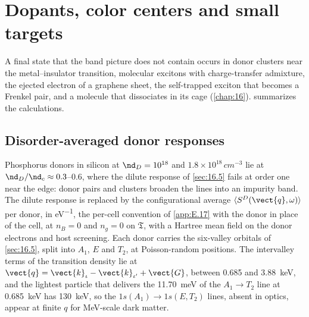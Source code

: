 \section{Dopants, color centers and small targets}\label{app:E.21}

A final state that the band picture does not contain occurs in donor clusters near the metal--insulator transition, molecular excitons with charge-transfer admixture, the ejected electron of a graphene sheet, the self-trapped exciton that becomes a Frenkel pair, and a molecule that dissociates in its cage (\cref{chap:16}).  summarizes the calculations.

\subsection{Disorder-averaged donor responses}

Phosphorus donors in silicon at $\nd_D = 10^{18}$ and $1.8\times10^{18}\,\si{cm^{-3}}$ lie at $\nd_D/\nd_c \approx 0.3$--0.6, where the dilute response of \cref{sec:16.5} fails at order one near the edge: donor pairs and clusters broaden the lines into an impurity band. The dilute response is replaced by the configurational average $\langle S^D(\vect{q},\omega)\rangle$ per donor, in \si{eV^{-1}}, the per-cell convention of \cref{app:E.17} with the donor in place of the cell, at $n_B = 0$ and $n_g = 0$ on $\mathfrak{T}$, with a Hartree mean field on the donor electrons and host screening. Each donor carries the six-valley orbitals of \cref{sec:16.5}, split into $A_1$, $E$ and $T_2$, at Poisson-random positions. The intervalley terms of the transition density lie at $\vect{q} = \vect{k}_\iota - \vect{k}_{\iota'} + \vect{G}$, between 0.685 and \SI{3.88}{keV}, and the lightest particle that delivers the \SI{11.70}{meV} of the $A_1 \to T_2$ line at \SI{0.685}{keV} has \SI{130}{keV}, so the $1s(A_1) \to 1s(E,T_2)$ lines, absent in optics, appear at finite $q$ for MeV-scale dark matter.

